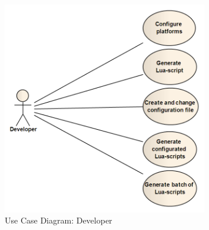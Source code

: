 \begin{figure}[htbp]
	\center
	\includegraphics[width=0.8\textwidth]{./planning/img/developer.png}
	\caption{Use Case Diagram: Developer\label{fig:req:ucdev}}
\end{figure}


